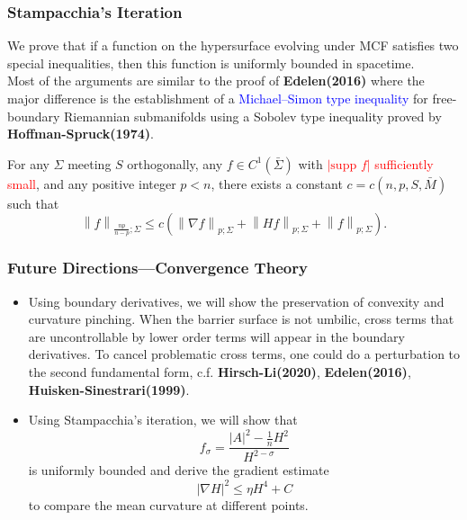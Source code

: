 \documentclass[pdf]{beamer}
\begin{document}
    \begin{frame}
        \frametitle{Stampacchia's Iteration}
        We prove that if a function on the hypersurface evolving under MCF satisfies two special inequalities, then this function is uniformly bounded in spacetime.\\
        \vspace{0.2cm} 
        Most of the arguments are similar to the proof of \textbf{Edelen(2016)} where the major difference is the establishment of a \textcolor{blue}{Michael--Simon type inequality} for free-boundary Riemannian submanifolds using a Sobolev type inequality proved by \textbf{Hoffman-Spruck(1974)}.
        \begin{theorem}
            For any $\Sigma $ meeting $S$ orthogonally, any $f \in C^{1}(\bar{\Sigma })$ with \textcolor{red}{$\left| \text{supp } f \right| $ sufficiently small}, and any positive integer $p<n$, there exists a constant $c=c(n,p,S,\bar{M})$ such that 
            \[\left\| f \right\| _{\frac{np}{n-p};\Sigma } \leq c(\left\| \nabla f \right\| _{p;\Sigma }+\left\| Hf \right\| _{p;\Sigma }+\left\|  f \right\| _{p;\Sigma }).\] 
        \end{theorem}
    \end{frame}

    \begin{frame}
        \frametitle{Future Directions---Convergence Theory}
        \begin{itemize}
            \justifying
            \item Using boundary derivatives, we will show the preservation of convexity and curvature pinching. When the barrier surface is not umbilic, cross terms that are uncontrollable by lower order terms will appear in the boundary derivatives.  To cancel problematic cross terms, one could do a perturbation to the second fundamental form, c.f. \textbf{Hirsch-Li(2020)}, \textbf{Edelen(2016)}, \textbf{Huisken-Sinestrari(1999)}.
            \item Using Stampacchia's iteration, we will show that \[f_\sigma =  \frac{\left| A \right| ^2-\frac{1}{n}H^2 }{H^{2-\sigma}} \] is uniformly bounded and derive the gradient estimate \[\left| \nabla H \right| ^2 \leq \eta H^4 + C\] to compare the mean curvature at different points.
        \end{itemize}
    \end{frame}
\end{document}
